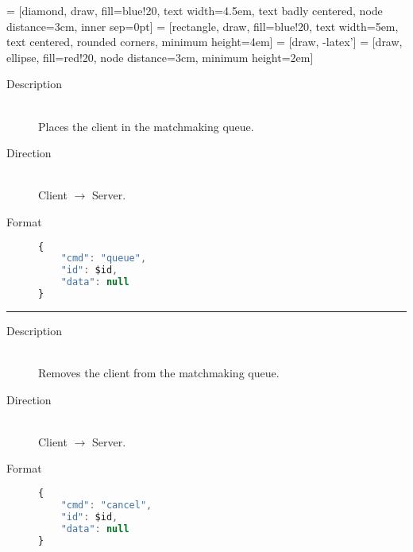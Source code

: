  = [diamond, draw, fill=blue!20, text width=4.5em, text badly centered, node distance=3cm, inner sep=0pt]
 = [rectangle, draw, fill=blue!20, text width=5em, text centered, rounded corners, minimum height=4em]
 = [draw, -latex']
 = [draw, ellipse, fill=red!20, node distance=3cm, minimum height=2em]

\begin{center}
\end{center}

\begin{description}
\item[Description] \hfill \\
	Places the client in the matchmaking queue.
\item[Direction] \hfill \\
	Client $\rightarrow$ Server.
\item[Format] \hfill
\begin{lstlisting}[language=JavaScript]
{
	"cmd": "queue",
	"id": $id,
	"data": null
}
\end{lstlisting}
\end{description}

\hrule

\begin{description}
\item[Description] \hfill \\
	Removes the client from the matchmaking queue.
\item[Direction] \hfill \\
	Client $\rightarrow$ Server.
\item[Format] \hfill
\begin{lstlisting}[language=JavaScript]
{
	"cmd": "cancel",
	"id": $id,
	"data": null
}
\end{lstlisting}
\end{description}

